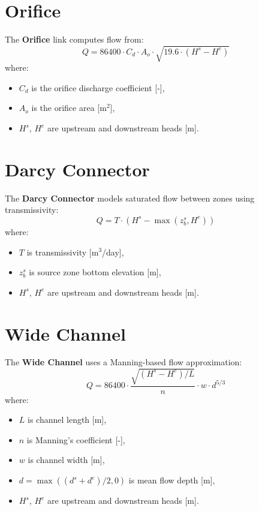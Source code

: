 \documentclass[12pt]{report}
\begin{document}
\section{Orifice}

The \textbf{Orifice} link computes flow from:
\begin{equation}
Q = 86400 \cdot C_d \cdot A_o \cdot \sqrt{19.6 \cdot (H^s - H^e)}
\end{equation}
where:
\begin{itemize}
  \item $C_d$ is the orifice discharge coefficient [-],
  \item $A_o$ is the orifice area [m$^2$],
  \item $H^s$, $H^e$ are upstream and downstream heads [m].
\end{itemize}

\section{Darcy Connector}

The \textbf{Darcy Connector} models saturated flow between zones using transmissivity:
\begin{equation}
Q = T \cdot (H^s - \max(z_b^s, H^e))
\end{equation}
where:
\begin{itemize}
  \item $T$ is transmissivity [m$^3$/day],
  \item $z_b^s$ is source zone bottom elevation [m],
  \item $H^s$, $H^e$ are upstream and downstream heads [m].
\end{itemize}

\section{Wide Channel}

The \textbf{Wide Channel} uses a Manning-based flow approximation:
\begin{equation}
Q = 86400 \cdot \frac{\sqrt{(H^s - H^e)/L}}{n} \cdot w \cdot d^{5/3}
\end{equation}
where:
\begin{itemize}
  \item $L$ is channel length [m],
  \item $n$ is Manning’s coefficient [-],
  \item $w$ is channel width [m],
  \item $d = \max((d^s + d^e)/2, 0)$ is mean flow depth [m],
  \item $H^s$, $H^e$ are upstream and downstream heads [m].
\end{itemize}
\end{document}
